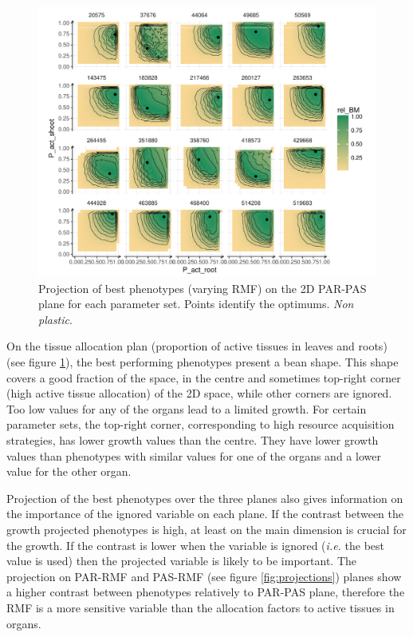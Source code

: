 \begin{figure}\label{fig:best_phenotypes}
\includegraphics[width = \textwidth]{./2_PP/Figures/Landscape/landscape_PAR-PAS.pdf}
\caption{Projection of best phenotypes (varying RMF) on the 2D PAR-PAS plane for each parameter set. Points identify the optimums. \textit{Non plastic}.}
\end{figure}

 On the tissue allocation plan (proportion of active tissues in leaves and roots) (see figure \ref{fig:best_phenotypes}), the best performing phenotypes present a bean shape. This shape covers a good fraction of the space, in the centre and sometimes top-right corner (high active tissue allocation) of the 2D space, while other corners are ignored. Too low values for any of the organs lead to a limited growth. For certain parameter sets, the top-right corner, corresponding to high resource acquisition strategies, has lower growth values than the centre. They have lower growth values than phenotypes with similar values for one of the organs and a lower value for the other organ.  %
 

Projection of the best phenotypes over the three planes also gives information on the importance of the ignored variable on each plane. If the contrast between the growth projected phenotypes is high, at least on the main dimension is crucial for the growth. If the contrast is lower when the variable is ignored (\textit{i.e.} the best value is used) then the projected variable is likely to be important. The projection on PAR-RMF and PAS-RMF (see figure \ref{fig:projections}) planes show a higher contrast between phenotypes relatively to PAR-PAS plane, therefore the RMF is a more sensitive variable than the allocation factors to active tissues in organs.


